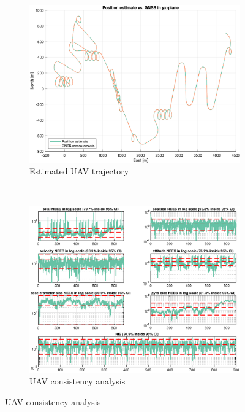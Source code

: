 \begin{figure}[ht]
    \centering
	\begin{subfigure}[b]{0.45\textwidth}
		\includegraphics[width=\textwidth]{figures/ga_2/sim_trajectory.eps}
    \caption{Estimated UAV trajectory}
    \label{fig:ga_2_sim_trajectory}
	\end{subfigure}%
       ~
	\begin{subfigure}[b]{0.45\textwidth}
		\includegraphics[width=\textwidth]{figures/ga_2/sim_consistency.eps}
    \caption{UAV consistency analysis}
    \label{fig:ga_2_sim_consistency}
	\end{subfigure}
    \label{fig:ga_2_sim_trajectory_consistency} 
\end{figure}

